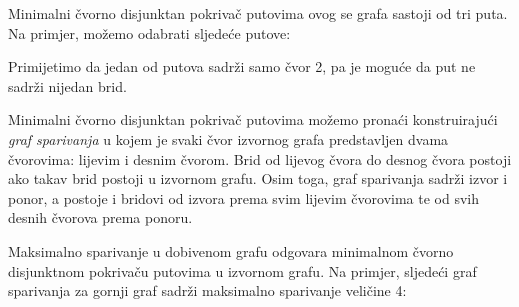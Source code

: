 Minimalni čvorno disjunktan pokrivač putovima
ovog se grafa
sastoji od tri puta.
Na primjer, možemo odabrati sljedeće putove:

\begin{center}
\end{center}

Primijetimo da jedan od putova sadrži samo čvor 2,
pa je moguće da put ne sadrži nijedan brid.

Minimalni čvorno disjunktan pokrivač putovima možemo pronaći
konstruirajući \emph{graf sparivanja} u kojem je svaki čvor
izvornog grafa predstavljen
dvama čvorovima: lijevim i desnim čvorom.
Brid od lijevog čvora do desnog čvora postoji
ako takav brid postoji u izvornom grafu.
Osim toga, graf sparivanja sadrži izvor i ponor,
a postoje i bridovi od izvora prema svim
lijevim čvorovima te od svih desnih čvorova prema ponoru.

Maksimalno sparivanje u dobivenom grafu odgovara
minimalnom čvorno disjunktnom pokrivaču putovima u
izvornom grafu.
Na primjer, sljedeći graf sparivanja
za gornji graf sadrži
maksimalno sparivanje veličine 4:

